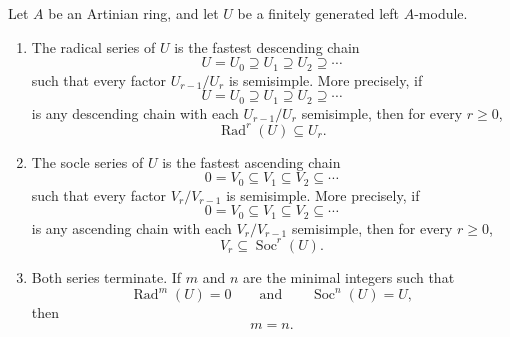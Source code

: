 \begin{theorem}\label{thm:rad-soc-fastest}
    Let $A$ be an Artinian ring, and let $U$ be a finitely generated left $A$-module.

    \begin{enumerate}
        \item The radical series of $U$ is the fastest descending chain
              \[
                  U=U_0\supseteq U_1\supseteq U_2\supseteq \cdots
              \]
              such that every factor $U_{r-1}/U_r$ is semisimple. More precisely, if
              \[
                  U=U_0\supseteq U_1\supseteq U_2\supseteq \cdots
              \]
              is any descending chain with each $U_{r-1}/U_r$ semisimple, then for every $r\ge 0$,
              \[
                  \operatorname{Rad}^r(U)\subseteq U_r.
              \]

        \item The socle series of $U$ is the fastest ascending chain
              \[
                  0=V_0\subseteq V_1\subseteq V_2\subseteq \cdots
              \]
              such that every factor $V_r/V_{r-1}$ is semisimple. More precisely, if
              \[
                  0=V_0\subseteq V_1\subseteq V_2\subseteq \cdots
              \]
              is any ascending chain with each $V_r/V_{r-1}$ semisimple, then for every $r\ge 0$,
              \[
                  V_r\subseteq \operatorname{Soc}^r(U).
              \]

        \item Both series terminate. If $m$ and $n$ are the minimal integers such that
              \[
                  \operatorname{Rad}^m(U)=0
                  \qquad\text{and}\qquad
                  \operatorname{Soc}^n(U)=U,
              \]
              then
              \[
                  m=n.
              \]
    \end{enumerate}
\end{theorem}

